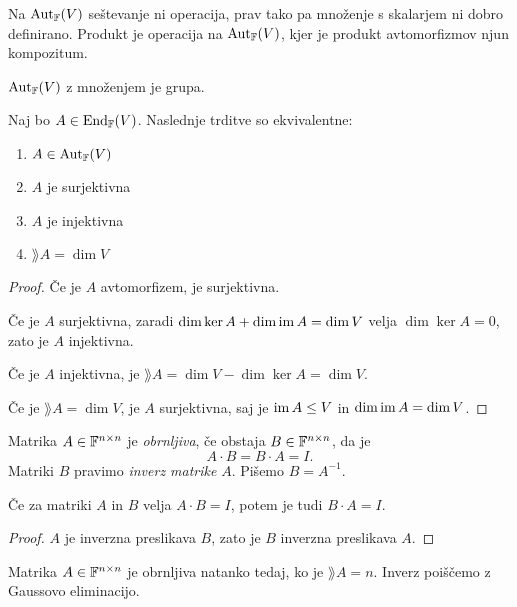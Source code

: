 \documentclass[12pt, a4paper]{article}
\begin{document}
Na $\operatorname{Aut}_{\mathbb{F}}(V)$ seštevanje ni operacija, prav tako pa množenje s skalarjem ni dobro definirano. Produkt je operacija na $\operatorname{Aut}_{\mathbb{F}}(V)$, kjer je produkt avtomorfizmov njun kompozitum.

\begin{trditev}
$\operatorname{Aut}_{\mathbb{F}}(V)$ z množenjem je grupa.
\end{trditev}

\obvs

\begin{trditev}
Naj bo $A\in\operatorname{End}_{\mathbb{F}}(V)$. Naslednje trditve so ekvivalentne:

\begin{enumerate}[label=\arabic*)]
\item $A\in\operatorname{Aut}_{\mathbb{F}}(V)$
\item $A$ je surjektivna
\item $A$ je injektivna
\item $\rang A=\dim V$
\end{enumerate}
\end{trditev}

\begin{proof}
Če je $A$ avtomorfizem, je surjektivna.

Če je $A$ surjektivna, zaradi $\dim\ker A+\dim\operatorname{im} A=\dim V$ velja $\dim\ker A=0$, zato je $A$ injektivna.

Če je $A$ injektivna, je $\rang A=\dim V-\dim\ker A=\dim V$.

Če je $\rang A=\dim V$, je $A$ surjektivna, saj je $\operatorname{im} A\leq V$ in $\dim\operatorname{im} A=\dim V$.
\end{proof}

\begin{definicija}
Matrika $A\in\mathbb{F}^{n\times n}$ je \emph{obrnljiva}, če obstaja $B\in\mathbb{F}^{n\times n}$, da je
\[
A\cdot B=B\cdot A=I.
\]
Matriki $B$ pravimo \emph{inverz matrike} $A$. Pišemo $B=A^{-1}$.
\end{definicija}

\begin{opomba}
Če za matriki $A$ in $B$ velja $A\cdot B=I$, potem je tudi $B\cdot A=I$.
\end{opomba}

\begin{proof}
$A$ je inverzna preslikava $B$, zato je $B$ inverzna preslikava $A$.
\end{proof}

\begin{opomba}
Matrika $A\in\mathbb{F}^{n\times n}$ je obrnljiva natanko tedaj, ko je $\rang A=n$. Inverz poiščemo z Gaussovo eliminacijo.
\end{opomba}
\end{document}
